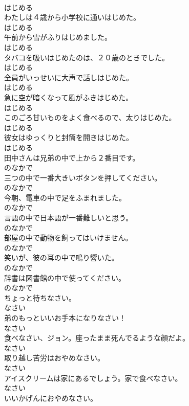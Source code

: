 \documentclass[8pt]{extreport}
\begin{document}
\begin{CJK}{UTF8}{min}
\\	はじめる
\\	わたしは４歳から小学校に通いはじめた。	
\\	はじめる
\\	午前から雪がふりはじめました。	
\\	はじめる
\\	タバコを吸いはじめたのは、２０歳のときでした。	
\\	はじめる
\\	全員がいっせいに大声で話しはじめた。	
\\	はじめる
\\	急に空が暗くなって風がふきはじめた。	
\\	はじめる
\\	このごろ甘いものをよく食べるので、太りはじめた。	
\\	はじめる
\\	彼女はゆっくりと封筒を開きはじめた。	
\\	はじめる
\\	田中さんは兄弟の中で上から２番目です。	
\\	のなかで
\\	三つの中で一番大きいボタンを押してください。	
\\	のなかで
\\	今朝、電車の中で足をふまれました。	
\\	のなかで
\\	言語の中で日本語が一番難しいと思う。	
\\	のなかで
\\	部屋の中で動物を飼ってはいけません。	
\\	のなかで
\\	笑いが、彼の耳の中で鳴り響いた。	
\\	のなかで
\\	辞書は図書館の中で使ってください。	
\\	のなかで
\\	ちょっと待ちなさい。	
\\	なさい
\\	弟のもっといいお手本になりなさい！	
\\	なさい
\\	食べなさい、ジョン。座ったまま死んでるような顔だよ。	
\\	なさい
\\	取り越し苦労はおやめなさい。	
\\	なさい
\\	アイスクリームは家にあるでしょう。家で食べなさい。	
\\	なさい
\\	いいかげんにおやめなさい。	

\end{CJK}
\end{document}

